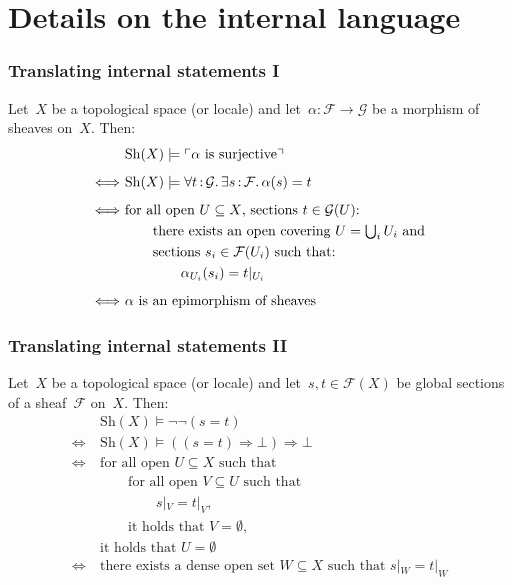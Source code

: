 \documentclass[12pt,utf8,notheorems,compress,t]{beamer}
\newcommand{\F}{\mathcal{F}}
\renewcommand{\G}{\mathcal{G}}
\newcommand{\Sh}{\mathrm{Sh}}
\renewcommand{\_}{\mathpunct{.}}
\newcommand{\?}{\,{:}\,}
\newcommand{\speak}[1]{\ulcorner\text{\textnormal{#1}}\urcorner}
\begin{document}
\appendix

\section{Details on the internal language}

\begin{frame}\frametitle{Translating internal statements I}
  Let~$X$ be a topological space (or locale) and let~$\alpha : \F \to \G$ be a
  morphism of sheaves on~$X$. Then:
  \allowdisplaybreaks
  \begin{align*}
    & \Sh(X) \models \speak{$\alpha$ is surjective} \\[0.5em]
    \Longleftrightarrow\
    & \Sh(X) \models \forall t\?\G\_ \exists s\?\F\_ \alpha(s) = t \\[0.5em]
    \Longleftrightarrow\ &
      \text{for all open~$U \subseteq X$, sections $t \in \G(U)$:} \\
    &\qquad
      \text{there exists an open covering~$U = \textstyle\bigcup_i U_i$ and} \\
    &\qquad
      \text{sections~$s_i \in \F(U_i)$ such that:} \\
    &\qquad\qquad
        \alpha_{U_i}(s_i) = t|_{U_i} \\[0.5em]
    \Longleftrightarrow\ &
      \text{$\alpha$ is an epimorphism of sheaves}
  \end{align*}
\end{frame}

\begin{frame}\frametitle{Translating internal statements II}
  Let~$X$ be a topological space (or locale) and let~$s, t \in \F(X)$ be global
  sections of a sheaf~$\F$ on~$X$. Then:
  \allowdisplaybreaks
  \begin{align*}
    & \Sh(X) \models \neg\neg(s = t) \\[0.5em]
    \Longleftrightarrow\
    & \Sh(X) \models ((s = t) \Rightarrow \bot) \Rightarrow \bot \\[0.5em]
    \Longleftrightarrow\ &
      \text{for all open~$U \subseteq X$ such that} \\
    &\qquad
      \text{for all open~$V \subseteq U$ such that} \\
    &\qquad\qquad
      s|_V = t|_V, \\
    &\qquad
      \text{it holds that~$V = \emptyset$,} \\
    &
      \text{it holds that~$U = \emptyset$} \\[0.5em]
    \Longleftrightarrow\ &
      \text{there exists a dense open set~$W \subseteq X$ such that $s|_W = t|_W$} \\
  \end{align*}
\end{frame}
\end{document}
